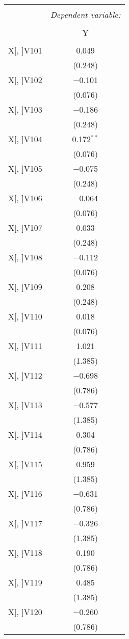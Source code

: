 \documentclass[11pt, a4paper]{article}
\begin{document}
\begin{multicols}{2}
\FloatBarrier
\begin{center}
\begin{tabular}{@{\extracolsep{5pt}}lc} 
\\[-1.8ex]\hline 
\hline \\[-1.8ex] 
 & \multicolumn{1}{c}{\textit{Dependent variable:}} \\ 
\cline{2-2} 
\\[-1.8ex] & Y \\ 
\hline \\[-1.8ex] 
 X[, ]V101 & 0.049 \\ 
  & (0.248) \\  
 X[, ]V102 & $-$0.101 \\ 
  & (0.076) \\  
 X[, ]V103 & $-$0.186 \\ 
  & (0.248) \\ 
 X[, ]V104 & 0.172$^{**}$ \\ 
  & (0.076) \\  
 X[, ]V105 & $-$0.075 \\ 
  & (0.248) \\  
 X[, ]V106 & $-$0.064 \\ 
  & (0.076) \\  
 X[, ]V107 & 0.033 \\ 
  & (0.248) \\ 
 X[, ]V108 & $-$0.112 \\
  & (0.076) \\  
 X[, ]V109 & 0.208 \\ 
  & (0.248) \\  
 X[, ]V110 & 0.018 \\ 
  & (0.076) \\  
 X[, ]V111 & 1.021 \\ 
  & (1.385) \\  
 X[, ]V112 & $-$0.698 \\ 
  & (0.786) \\  
 X[, ]V113 & $-$0.577 \\ 
  & (1.385) \\  
 X[, ]V114 & 0.304 \\ 
  & (0.786) \\  
 X[, ]V115 & 0.959 \\ 
  & (1.385) \\  
 X[, ]V116 & $-$0.631 \\ 
  & (0.786) \\  
 X[, ]V117 & $-$0.326 \\ 
  & (1.385) \\  
 X[, ]V118 & 0.190 \\ 
  & (0.786) \\  
 X[, ]V119 & 0.485 \\ 
  & (1.385) \\  
 X[, ]V120 & $-$0.260 \\ 
  & (0.786) \\  
\end{tabular} 
\end{center}
\FloatBarrier


\end{multicols}
\end{document}
